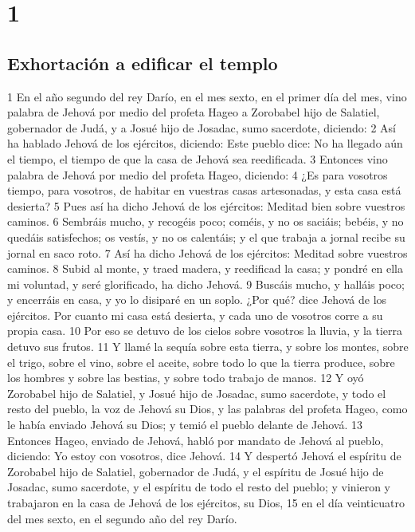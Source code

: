 
\chapter{1}

\section*{Exhortación a edificar el templo}

1 En el año segundo del rey Darío, en el mes sexto, en el primer día del mes, vino palabra de Jehová por medio del profeta Hageo a Zorobabel hijo de Salatiel, gobernador de Judá, y a Josué hijo de Josadac, sumo sacerdote, diciendo:
2 Así ha hablado Jehová de los ejércitos, diciendo: Este pueblo dice: No ha llegado aún el tiempo, el tiempo de que la casa de Jehová sea reedificada.
3 Entonces vino palabra de Jehová por medio del profeta Hageo, diciendo:
4 ¿Es para vosotros tiempo, para vosotros, de habitar en vuestras casas artesonadas, y esta casa está desierta?
5 Pues así ha dicho Jehová de los ejércitos: Meditad bien sobre vuestros caminos.
6 Sembráis mucho, y recogéis poco; coméis, y no os saciáis; bebéis, y no quedáis satisfechos; os vestís, y no os calentáis; y el que trabaja a jornal recibe su jornal en saco roto.
7 Así ha dicho Jehová de los ejércitos: Meditad sobre vuestros caminos.
8 Subid al monte, y traed madera, y reedificad la casa; y pondré en ella mi voluntad, y seré glorificado, ha dicho Jehová.
9 Buscáis mucho, y halláis poco; y encerráis en casa, y yo lo disiparé en un soplo. ¿Por qué? dice Jehová de los ejércitos. Por cuanto mi casa está desierta, y cada uno de vosotros corre a su propia casa.
10 Por eso se detuvo de los cielos sobre vosotros la lluvia, y la tierra detuvo sus frutos.
11 Y llamé la sequía sobre esta tierra, y sobre los montes, sobre el trigo, sobre el vino, sobre el aceite, sobre todo lo que la tierra produce, sobre los hombres y sobre las bestias, y sobre todo trabajo de manos.
12 Y oyó Zorobabel hijo de Salatiel, y Josué hijo de Josadac, sumo sacerdote, y todo el resto del pueblo, la voz de Jehová su Dios, y las palabras del profeta Hageo, como le había enviado Jehová su Dios; y temió el pueblo delante de Jehová.
13 Entonces Hageo, enviado de Jehová, habló por mandato de Jehová al pueblo, diciendo: Yo estoy con vosotros, dice Jehová.
14 Y despertó Jehová el espíritu de Zorobabel hijo de Salatiel, gobernador de Judá, y el espíritu de Josué hijo de Josadac, sumo sacerdote, y el espíritu de todo el resto del pueblo; y vinieron y trabajaron en la casa de Jehová de los ejércitos, su Dios,
15 en el día veinticuatro del mes sexto, en el segundo año del rey Darío.

